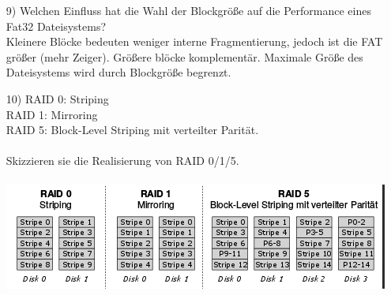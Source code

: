 \documentclass[11pt,a4paper]{article}
\begin{document}
\begin{itemize}
\item[9)] Welchen Einfluss hat die Wahl der Blockgröße auf die Performance eines Fat32 Dateisystems?\\

Kleinere Blöcke bedeuten weniger interne Fragmentierung, jedoch ist die FAT größer (mehr Zeiger). Größere blöcke komplementär. Maximale Größe des Dateisystems wird durch Blockgröße begrenzt. 


\pagebreak

\item[10)] RAID 0: Striping \\RAID 1: Mirroring \\ RAID 5: Block-Level Striping mit verteilter Parität.
\\\\Skizzieren sie die Realisierung von RAID 0/1/5.\\
\\
\includegraphics[scale=1]{raid.png}

\end{itemize}
\end{document}
